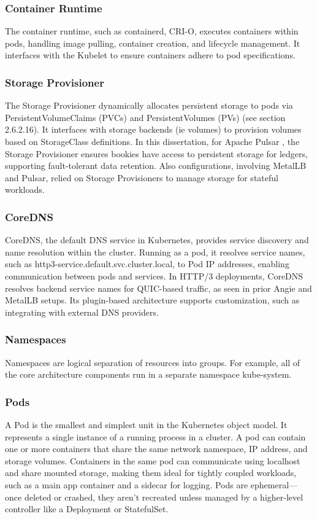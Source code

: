\subsubsection{Container Runtime}
The container runtime, such as containerd, CRI-O, executes containers within pods, handling image pulling, container creation, and lifecycle management. It interfaces with the Kubelet to ensure containers adhere to pod specifications.

\subsubsection{Storage Provisioner}
The Storage Provisioner dynamically allocates persistent storage to pods via PersistentVolumeClaims (PVCs) and PersistentVolumes (PVs) (see section 2.6.2.16). It interfaces with storage backends (ie volumes) to provision volumes based on StorageClass definitions. In this dissertation, for Apache Pulsar \cite{pulsar-helm-repo}, the Storage Provisioner ensures bookies have access to persistent storage for ledgers, supporting fault-tolerant data retention. Also configurations, involving MetalLB and Pulsar, relied on Storage Provisioners to manage storage for stateful workloads.

\subsubsection{CoreDNS}
CoreDNS, the default DNS service in Kubernetes, provides service discovery and name resolution within the cluster. Running as a pod, it resolves service names, such as http3-service.default.svc.cluster.local, to Pod IP addresses, enabling communication between pods and services. In HTTP/3 deployments, CoreDNS resolves backend service names for QUIC-based traffic, as seen in prior Angie and MetalLB setups. Its plugin-based architecture supports customization, such as integrating with external DNS providers.

\subsubsection{Namespaces}
Namespaces are logical separation of resources into groups. For example, all of the core architecture components run in a separate namespace kube-system.

\subsubsection{Pods}
A Pod is the smallest and simplest unit in the Kubernetes object model. It represents a single instance of a running process in a cluster. A pod can contain one or more containers that share the same network namespace, IP address, and storage volumes. Containers in the same pod can communicate using localhost and share mounted storage, making them ideal for tightly coupled workloads, such as a main app container and a sidecar for logging. Pods are ephemeral—once deleted or crashed, they aren't recreated unless managed by a higher-level controller like a Deployment or StatefulSet.


